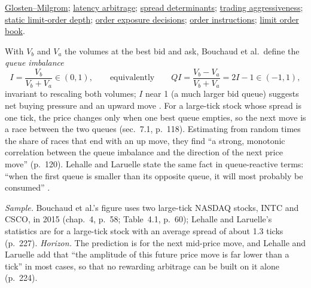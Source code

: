 \begin{qfresult}
 \hyperref[mod:glosten-milgrom]{Glosten--Milgrom}; \hyperref[res:latency-arbitrage-arms-race]{latency arbitrage}; \hyperref[res:spread-determinants]{spread determinants}; \hyperref[meth:aggressiveness-tradeoff]{trading aggressiveness}; \hyperref[mod:static-limit-order-depth]{static limit-order depth}; \hyperref[def:order-exposure-decisions]{order exposure decisions}; \hyperref[def:order-instructions]{order instructions}; \hyperref[def:limit-order-book]{limit order book}.

\end{qfresult}

\begin{qfdefinition}\label{def:queue-imbalance}
 With $V_b$ and $V_a$ the volumes at the best bid and ask, Bouchaud et al.\ define the \emph{queue imbalance}
\[ I=\frac{V_b}{V_b+V_a}\in(0,1),\qquad\text{equivalently}\qquad QI=\frac{V_b-V_a}{V_b+V_a}=2I-1\in(-1,1), \]
invariant to rescaling both volumes; $I$ near 1 (a much larger bid queue) suggests net buying pressure and an upward move \citep[chap.~7, sec.~7.2, eq.~(7.1), p.~119]{catalogue-0528}. For a large-tick stock whose spread is one tick, the price changes only when one best queue empties, so the next move is a race between the two queues (sec.~7.1, p.~118). Estimating from random times the share of races that end with an up move, they find ``a strong, monotonic correlation between the queue imbalance and the direction of the next price move'' (p.~120). Lehalle and Laruelle state the same fact in queue-reactive terms: ``when the first queue is smaller than its opposite queue, it will most probably be consumed'' \citep[chap.~3, sec.~3.3.2, pp.~223--224]{alpha-laruelle}.

 \emph{Sample.} Bouchaud et al.'s figure uses two large-tick NASDAQ stocks, INTC and CSCO, in 2015 (chap.~4, p.~58; Table~4.1, p.~60); Lehalle and Laruelle's statistics are for a large-tick stock with an average spread of about 1.3 ticks (p.~227). \emph{Horizon.} The prediction is for the next mid-price move, and Lehalle and Laruelle add that ``the amplitude of this future price move is far lower than a tick'' in most cases, so that no rewarding arbitrage can be built on it alone (p.~224).


\end{qfdefinition}
